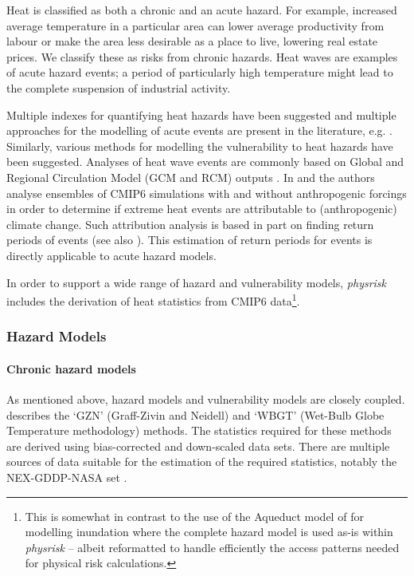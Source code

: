 \documentclass[a4paper,11pt]{extarticle} %
\theoremstyle{definition}
\begin{document}
Heat is classified as both a chronic and an acute hazard.  For example, increased average temperature in a particular area can lower average productivity from labour or make the area less desirable as a place to live, lowering real estate prices. We classify these as risks from chronic hazards. Heat waves are examples of acute hazard events; a period of particularly high temperature might lead to the complete suspension of industrial activity.

Multiple indexes for quantifying heat hazards have been suggested and multiple approaches for the modelling of acute events are present in the literature, e.g. \cite{MazdiyasniEtAl:2019}. Similarly, various methods for modelling the vulnerability to heat hazards have been suggested. Analyses of heat wave events are commonly based on Global and Regional Circulation Model (GCM and RCM) outputs \cite{DosioEtAl:2018}. In \cite{Christidis:2021} and \cite{Christidis:2013} the authors analyse ensembles of CMIP6 simulations with and without anthropogenic forcings in order to determine if extreme heat events are attributable to (anthropogenic) climate change. Such attribution analysis is based in part on finding return periods of events (see also \cite{StottEtAl:2016}). This estimation of return periods for events is directly applicable to acute hazard models.

In order to support a wide range of hazard and vulnerability models,  \emph{physrisk} includes the derivation of heat statistics from CMIP6 data\footnote{This is somewhat in contrast to the use of the Aqueduct model of \cite{WardEtAl:2020} for modelling inundation where the complete hazard model is used as-is within \emph{physrisk} -- albeit reformatted to handle efficiently the access patterns needed for physical risk calculations.}.

\subsubsection{Hazard Models}

\paragraph{Chronic hazard models}
As mentioned above, hazard models and vulnerability models are closely coupled. \cite{ZhangAndShindell:2021} describes the `GZN' (Graff-Zivin and Neidell) and `WBGT' (Wet-Bulb Globe Temperature methodology) methods. The statistics required for these methods are derived using bias-corrected and down-scaled data sets. There are multiple sources of data suitable for the estimation of the required statistics, notably the NEX-GDDP-NASA set \cite{ThrasherEtAl:2022}.
\end{document}
